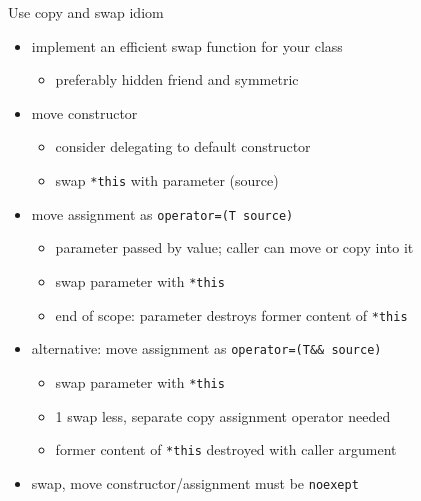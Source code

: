 \begin{frame}[fragile]
  \begin{block}{Use copy and swap idiom}
    \begin{itemize}
    \item implement an efficient swap function for your class
      \begin{itemize}
      \item preferably hidden friend and symmetric
      \end{itemize}
    \item move constructor
      \begin{itemize}
      \item consider delegating to default constructor
      \item swap \texttt{*this} with parameter (source)
      \end{itemize}
    \item move assignment as \texttt{operator=(T source)}
      \begin{itemize}
      \item parameter passed by value; caller can move or copy into it
      \item swap parameter with \texttt{*this}
      \item end of scope: parameter destroys former content of \texttt{*this}
      \end{itemize}
    \item alternative: move assignment as \texttt{operator=(T&& source)}
      \begin{itemize}
      \item swap parameter with \texttt{*this}
      \item 1 swap less, separate copy assignment operator needed
      \item former content of \texttt{*this} destroyed with caller argument
      \end{itemize}
    \item swap, move constructor/assignment must be \texttt{noexept}
    \end{itemize}
  \end{block}
\end{frame}

